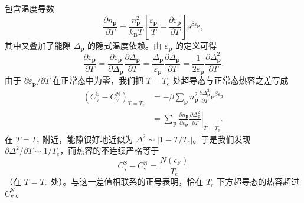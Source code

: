 包含温度导数
\begin{equation*}
\frac{\partial n_{\mathbf{p}}}{\partial T}=\frac{n_{\mathbf{p}}^{2}}{k_{\mathrm{B}}T}\left[\frac{\varepsilon_{\mathbf{p}}}{T}-\frac{\partial\varepsilon_{\mathbf{p}}}{\partial T}\right]\mathrm{e}^{\beta\varepsilon_{\mathbf{p}}},\tag{12.262}
\end{equation*}
其中又叠加了能隙 $\Delta_{\mathbf{p}}$ 的隐式温度依赖。由 $\varepsilon_{\mathbf{p}}$ 的定义可得
\begin{equation*}
\frac{\partial\varepsilon_{\mathbf{p}}}{\partial T}=\frac{\partial\varepsilon_{\mathbf{p}}}{\partial\Delta_{\mathbf{p}}}\frac{\partial\Delta_{\mathbf{p}}}{\partial T}=\frac{\Delta_{\mathbf{p}}}{\varepsilon_{\mathbf{p}}}\frac{\partial\Delta_{\mathbf{p}}}{\partial T}=\frac{1}{2\varepsilon_{\mathbf{p}}}\frac{\partial\Delta_{\mathbf{p}}^{2}}{\partial T}.\tag{12.263}
\end{equation*}
由于 $\partial\varepsilon_{\mathbf{p}}/\partial T$ 在正常态中为零，我们把 $T=T_{\mathrm{c}}$ 处超导态与正常态热容之差写成
\begin{align*}
\left(C_{\mathrm{v}}^{\mathrm{S}}-C_{\mathrm{v}}^{\mathrm{N}}\right)_{T=T_{\mathrm{c}}}&=-\beta\sum_{\mathbf{p}}n_{\mathbf{p}}^{2}\frac{\partial\Delta_{\mathbf{p}}^{2}}{\partial T}\mathrm{e}^{\beta\varepsilon_{\mathbf{p}}}\\
&=\sum_{\mathbf{p}}\left.\frac{\partial n_{\mathbf{p}}}{\partial\varepsilon_{\mathbf{p}}}\frac{\partial\Delta_{\mathbf{p}}^{2}}{\partial T}\right|_{T=T_{\mathrm{c}}}.\tag{12.264}
\end{align*}
在 $T=T_{\mathrm{c}}$ 附近，能隙很好地近似为 $\Delta^{2}\sim|1-T/T_{\mathrm{c}}|$。于是我们发现 $\partial\Delta^{2}/\partial T\sim 1/T_{\mathrm{c}}$，而热容的不连续严格等于
\begin{equation*}
C_{\mathrm{v}}^{\mathrm{S}}-C_{\mathrm{v}}^{\mathrm{N}}=\frac{N(\epsilon_{\mathrm{F}})}{T_{\mathrm{c}}}\tag{12.265}
\end{equation*}
（在 $T=T_{\mathrm{c}}$ 处）。与这一差值相联系的正号表明，恰在 $T_{\mathrm{c}}$ 下方超导态的热容超过 $C_{\mathrm{v}}^{\mathrm{N}}$。


